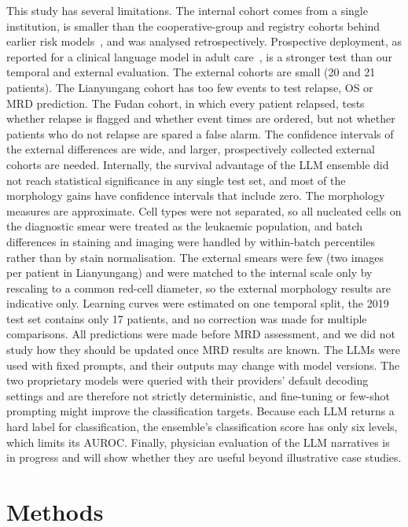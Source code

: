 \documentclass[pdflatex,sn-nature]{sn-jnl}
\begin{document}
This study has several limitations.
The internal cohort comes from a single institution, is smaller than
the cooperative-group and registry cohorts behind earlier risk
models~\cite{[CITE:Schultz2007],[CITE:He2022],[CITE:Sang2026]}, and was
analysed retrospectively.
Prospective deployment, as reported for a clinical language model in
adult care~\cite{[CITE:Jiang2023NYUTron]}, is a stronger test than our
temporal and external evaluation.
The external cohorts are small (20 and 21 patients).
The Lianyungang cohort has too few events to test relapse, OS or MRD
prediction.
The Fudan cohort, in which every patient relapsed, tests whether
relapse is flagged and whether event times are ordered, but not
whether patients who do not relapse are spared a false alarm.
The confidence intervals of the external differences are wide, and
larger, prospectively collected external cohorts are needed.
Internally, the survival advantage of the LLM ensemble did not reach
statistical significance in any single test set, and most of the
morphology gains have confidence intervals that include zero.
The morphology measures are approximate.
Cell types were not separated, so all nucleated cells on the
diagnostic smear were treated as the leukaemic population, and batch
differences in staining and imaging were handled by within-batch
percentiles rather than by stain normalisation.
The external smears were few (two images per patient in Lianyungang)
and were matched to the internal scale only by rescaling to a common
red-cell diameter, so the external morphology results are indicative
only.
Learning curves were estimated on one temporal split, the 2019 test
set contains only 17 patients, and no correction was made for multiple
comparisons.
All predictions were made before MRD assessment, and we did not study
how they should be updated once MRD results are known.
The LLMs were used with fixed prompts, and their outputs may change
with model versions.
The two proprietary models were queried with their providers' default
decoding settings and are therefore not strictly deterministic, and
fine-tuning or few-shot prompting might improve the classification
targets.
Because each LLM returns a hard label for classification, the
ensemble's classification score has only six levels, which limits its
AUROC.
Finally, physician evaluation of the LLM narratives is in progress and
will show whether they are useful beyond illustrative case studies.

\section{Methods}\label{sec:methods}
\end{document}
